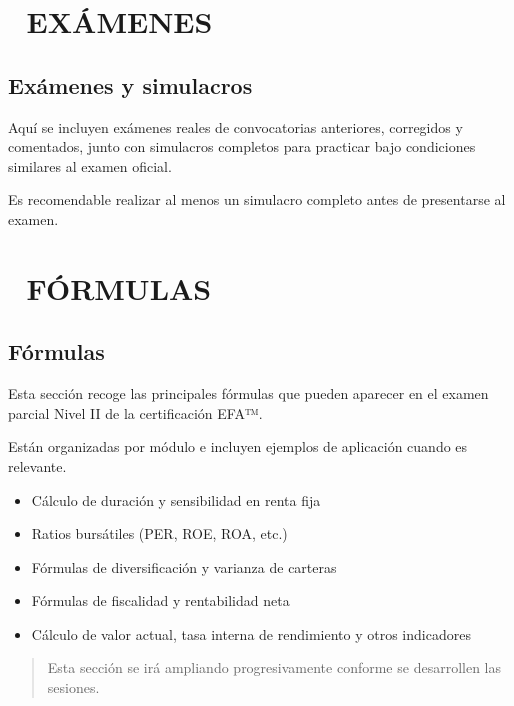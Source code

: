 \documentclass[
  letterpaper,
  DIV=11,
  numbers=noendperiod]{scrreprt}
\providecommand{\tightlist}{%
  \setlength{\itemsep}{0pt}\setlength{\parskip}{0pt}}\usepackage{longtable,booktabs,array}
\begin{document}
\begin{tcolorbox}
\part{📝 EXÁMENES}

\chapter{Exámenes y simulacros}\label{exuxe1menes-y-simulacros}

Aquí se incluyen exámenes reales de convocatorias anteriores, corregidos
y comentados, junto con simulacros completos para practicar bajo
condiciones similares al examen oficial.

Es recomendable realizar al menos un simulacro completo antes de
presentarse al examen.

\part{📐 FÓRMULAS}

\chapter{Fórmulas}\label{fuxf3rmulas-1}

Esta sección recoge las principales fórmulas que pueden aparecer en el
examen parcial Nivel II de la certificación EFA™.

Están organizadas por módulo e incluyen ejemplos de aplicación cuando es
relevante.

\begin{itemize}
\tightlist
\item
  Cálculo de duración y sensibilidad en renta fija\\
\item
  Ratios bursátiles (PER, ROE, ROA, etc.)\\
\item
  Fórmulas de diversificación y varianza de carteras\\
\item
  Fórmulas de fiscalidad y rentabilidad neta\\
\item
  Cálculo de valor actual, tasa interna de rendimiento y otros
  indicadores
\end{itemize}

\begin{quote}
Esta sección se irá ampliando progresivamente conforme se desarrollen
las sesiones.
\end{quote}


\end{tcolorbox}
\end{document}
